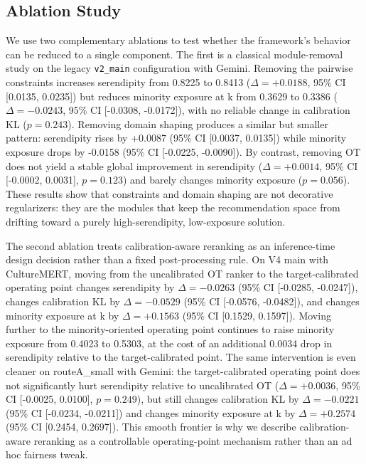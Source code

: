 \subsection{Ablation Study}

We use two complementary ablations to test whether the framework's behavior can be reduced to a single component. The first is a classical module-removal study on the legacy \texttt{v2\_main} configuration with Gemini. Removing the pairwise constraints increases serendipity from 0.8225 to 0.8413 ($\Delta=+0.0188$, 95\% CI [0.0135, 0.0235]) but reduces minority exposure at k from 0.3629 to 0.3386 ($\Delta=-0.0243$, 95\% CI [-0.0308, -0.0172]), with no reliable change in calibration KL ($p=0.243$). Removing domain shaping produces a similar but smaller pattern: serendipity rises by +0.0087 (95\% CI [0.0037, 0.0135]) while minority exposure drops by -0.0158 (95\% CI [-0.0225, -0.0090]). By contrast, removing OT does not yield a stable global improvement in serendipity ($\Delta=+0.0014$, 95\% CI [-0.0002, 0.0031], $p=0.123$) and barely changes minority exposure ($p=0.056$). These results show that constraints and domain shaping are not decorative regularizers: they are the modules that keep the recommendation space from drifting toward a purely high-serendipity, low-exposure solution.

The second ablation treats calibration-aware reranking as an inference-time design decision rather than a fixed post-processing rule. On V4 main with CultureMERT, moving from the uncalibrated OT ranker to the target-calibrated operating point changes serendipity by $\Delta=-0.0263$ (95\% CI [-0.0285, -0.0247]), changes calibration KL by $\Delta=-0.0529$ (95\% CI [-0.0576, -0.0482]), and changes minority exposure at k by $\Delta=+0.1563$ (95\% CI [0.1529, 0.1597]). Moving further to the minority-oriented operating point continues to raise minority exposure from 0.4023 to 0.5303, at the cost of an additional 0.0034 drop in serendipity relative to the target-calibrated point. The same intervention is even cleaner on routeA_small with Gemini: the target-calibrated operating point does not significantly hurt serendipity relative to uncalibrated OT ($\Delta=+0.0036$, 95\% CI [-0.0025, 0.0100], $p=0.249$), but still changes calibration KL by $\Delta=-0.0221$ (95\% CI [-0.0234, -0.0211]) and changes minority exposure at k by $\Delta=+0.2574$ (95\% CI [0.2454, 0.2697]). This smooth frontier is why we describe calibration-aware reranking as a controllable operating-point mechanism rather than an ad hoc fairness tweak.

